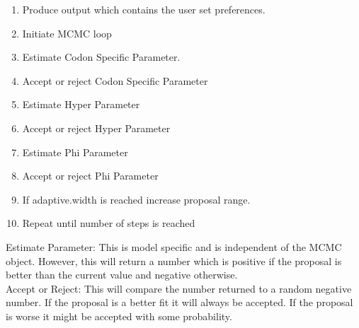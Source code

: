\documentclass{article}
\begin{document}
\begin{enumerate}
\begin{enumerate}
\item Produce output which contains the user set preferences.
\item Initiate MCMC loop
\item Estimate Codon Specific Parameter.
\item Accept or reject Codon Specific Parameter
\item Estimate Hyper Parameter
\item Accept or reject Hyper Parameter
\item Estimate Phi Parameter
\item Accept or reject Phi Parameter
\item If adaptive.width is reached increase proposal range.
\item Repeat until number of steps is reached
\end{enumerate}
Estimate Parameter: This is model specific and is independent of the MCMC object. However, this will return a number which is positive if the proposal is better than the current value and negative otherwise.\\
Accept or Reject: This will compare the number returned to a random negative number. If the proposal is a better fit it will always be accepted. If the proposal is worse it might be accepted with some probability.
\end{enumerate} 
\end{document}
